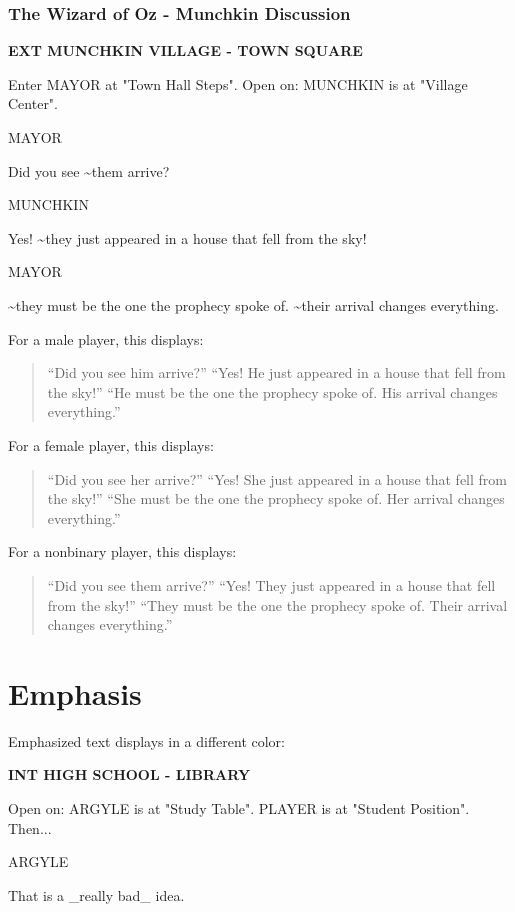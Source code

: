 \documentclass[11pt,letterpaper,oldstylefigures]{memoir}
\newcommand{\slugline}[1]{\nobreak\textbf{\MakeUppercase{#1}}\par\nobreak\vspace{1\baselineskip}}
\newcommand{\speaker}[1]{\nobreak\hspace*{0.333\textwidth}\MakeUppercase{#1}\par\nobreak\vspace{0.5\baselineskip}}
\newcommand{\dialogue}[1]{\nobreak\hspace*{0.25\textwidth}\begin{minipage}{0.5\textwidth}#1\end{minipage}\par\vspace{1\baselineskip}}
\newcommand{\stagedir}[1]{#1\par\vspace{1\baselineskip}}
\newenvironment{FountainExample}
  {\begingroup
  \ttfamily\small
   \setlength{\parindent}{0pt}
  \setlength{\parskip}{0.5em}
  \allowdisplaybreaks
  \setlength{\displaywidowpenalty}{0}
  \setlength{\widowpenalty}{0}
  \setlength{\clubpenalty}{0}
  \setlength{\interlinepenalty}{0}
}
  {\endgroup}
\begin{document}
\subsubsection*{The Wizard of Oz - Munchkin Discussion}
\label{ex:wizard-of-oz-munchkin-discussion}

\begin{FountainExample}
\slugline{EXT MUNCHKIN VILLAGE - TOWN SQUARE}

\stagedir{Enter MAYOR at "Town Hall Steps". Open on: MUNCHKIN is at "Village Center".}

\speaker{MAYOR}
\dialogue{Did you see \textasciitilde{}them arrive?}

\speaker{MUNCHKIN}
\dialogue{Yes! \textasciitilde{}they just appeared in a house that fell from the sky!}

\speaker{MAYOR}
\dialogue{\textasciitilde{}they must be the one the prophecy spoke of. \textasciitilde{}their arrival changes everything.}
\end{FountainExample}

For a male player, this displays:
\begin{quote}
``Did you see him arrive?''
``Yes! He just appeared in a house that fell from the sky!''
``He must be the one the prophecy spoke of. His arrival changes everything.''
\end{quote}

For a female player, this displays:
\begin{quote}
``Did you see her arrive?''
``Yes! She just appeared in a house that fell from the sky!''
``She must be the one the prophecy spoke of. Her arrival changes everything.''
\end{quote}

For a nonbinary player, this displays:
\begin{quote}
``Did you see them arrive?''
``Yes! They just appeared in a house that fell from the sky!''
``They must be the one the prophecy spoke of. Their arrival changes everything.''
\end{quote}

\section{Emphasis}

Emphasized text displays in a different color:

\begin{FountainExample}
\slugline{INT HIGH SCHOOL - LIBRARY}

\stagedir{Open on: ARGYLE is at "Study Table". PLAYER is at "Student Position". Then...}

\speaker{ARGYLE}
\dialogue{That is a \_really bad\_ idea.}
\end{FountainExample}
\end{document}
